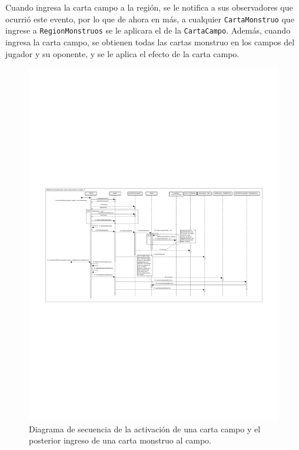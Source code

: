 	Cuando ingresa la carta campo a la región, se le notifica a sus observadores que ocurrió este evento, por lo que de ahora en más, a cualquier \texttt{CartaMonstruo} que ingrese a \texttt{RegionMonstruos} se le aplicara el  de la \texttt{CartaCampo}. Además, cuando ingresa la carta campo, se obtienen todas las cartas monstruo en los campos del jugador y su oponente, y se le aplica el efecto de la carta campo.
	
	\begin{figure}[H]
		\centering
		\includegraphics[scale=0.9]{includes/seq_Se_activa_una_carta_campo_y_entran_cartas_monstruo_a_la_region}
		\caption{Diagrama de secuencia de la activación de una carta campo y el posterior ingreso de una carta monstruo al campo.}
		\label{seq_Se_activa_una_carta_campo_y_entran_cartas_monstruo_a_la_region}
	\end{figure}
	
